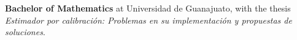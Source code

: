 \documentclass[]{friggeri-cv}
\begin{document}
\begin{entrylist}
{\begin{tabular}{l}
	\end{tabular}
    }
    {\vspace{-1.49cm}}
    { }
    {\textbf{Bachelor of Mathematics} at Universidad de Guanajuato, with the thesis \textsl{Estimador por calibración: Problemas en su implementación y propuestas de soluciones}.}
    \end{entrylist}
\vspace{-0.5cm}
\end{document}
